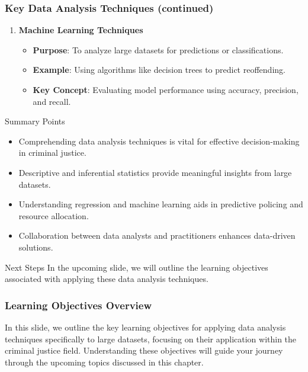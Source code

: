 \documentclass[aspectratio=169]{beamer}
\begin{document}
\begin{frame}[fragile]
    \frametitle{Key Data Analysis Techniques (continued)}
    \begin{enumerate}[resume]
        \item \textbf{Machine Learning Techniques}
            \begin{itemize}
                \item \textbf{Purpose}: To analyze large datasets for predictions or classifications.
                \item \textbf{Example}: Using algorithms like decision trees to predict reoffending.
                \item \textbf{Key Concept}: Evaluating model performance using accuracy, precision, and recall.
            \end{itemize}
    \end{enumerate}

    \begin{block}{Summary Points}
        \begin{itemize}
            \item Comprehending data analysis techniques is vital for effective decision-making in criminal justice.
            \item Descriptive and inferential statistics provide meaningful insights from large datasets.
            \item Understanding regression and machine learning aids in predictive policing and resource allocation.
            \item Collaboration between data analysts and practitioners enhances data-driven solutions.
        \end{itemize}
    \end{block}

    \begin{block}{Next Steps}
        In the upcoming slide, we will outline the learning objectives associated with applying these data analysis techniques.
    \end{block}
\end{frame}

\begin{frame}[fragile]
    \frametitle{Learning Objectives Overview}
    In this slide, we outline the key learning objectives for applying data analysis techniques specifically to large datasets, focusing on their application within the criminal justice field. Understanding these objectives will guide your journey through the upcoming topics discussed in this chapter.
\end{frame}
\end{document}
